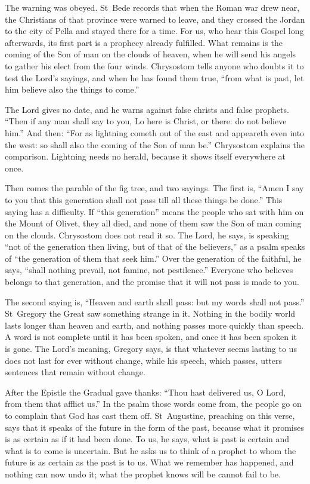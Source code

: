 The warning was obeyed. St~Bede records that when the Roman war drew near, the
Christians of that province were warned to leave, and they crossed the Jordan
to the city of Pella and stayed there for a time. For us, who hear this Gospel
long afterwards, its first part is a prophecy already fulfilled. What remains
is the coming of the Son of man on the clouds of heaven, when he will send his
angels to gather his elect from the four winds. Chrysostom tells anyone who
doubts it to test the Lord's sayings, and when he has found them true, ``from
what is past, let him believe also the things to come.''

The Lord gives no date, and he warns against false christs and false
prophets. ``Then if any man shall say to you, Lo here is Christ, or
there: do not believe him.'' And then: ``For as lightning cometh out of the
east and appeareth even into the west: so shall also the coming of the Son of
man be.'' Chrysostom explains the comparison. Lightning needs no herald,
because it shows itself everywhere at once.

Then comes the parable of the fig tree, and two sayings. The first is, ``Amen
I say to you that this generation shall not pass till all these things be
done.'' This saying has a difficulty. If ``this generation'' means the people
who sat with him on the Mount of Olivet, they all died, and none of them saw
the Son of man coming on the clouds. Chrysostom does not read it so. The Lord,
he says, is speaking ``not of the generation then living, but of that of the
believers,'' as a psalm speaks of ``the generation of them that seek him.''
Over the generation of the faithful, he says, ``shall nothing prevail, not
famine, not pestilence.'' Everyone who believes belongs to that generation,
and the promise that it will not pass is made to you.

The second saying is, ``Heaven and earth shall pass: but my words shall not
pass.'' St~Gregory the Great saw something strange in it. Nothing in the
bodily world lasts longer than heaven and earth, and nothing passes more
quickly than speech. A word is not complete until it has been spoken, and once
it has been spoken it is gone. The Lord's meaning, Gregory says, is that
whatever seems lasting to us does not last for ever without change, while his
speech, which passes, utters sentences that remain without change.

After the Epistle the Gradual gave thanks: ``Thou hast delivered us, O Lord,
from them that afflict us.'' In the psalm those words come from, the people go
on to complain that God has cast them off. St~Augustine, preaching on this
verse, says that it speaks of the future in the form of the past, because what
it promises is as certain as if it had been done. To us, he says, what is past
is certain and what is to come is uncertain. But he asks us to think of a
prophet to whom the future is as certain as the past is to us. What we
remember has happened, and nothing can now undo it; what the prophet knows
will be cannot fail to be.

